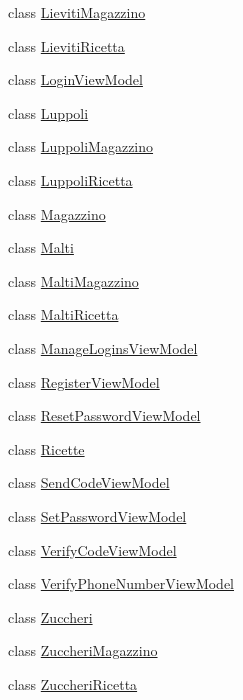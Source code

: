 \begin{DoxyCompactItemize}
\item 
class \mbox{\hyperlink{class_brew_day2_1_1_models_1_1_lieviti_magazzino}{Lieviti\+Magazzino}}
\item 
class \mbox{\hyperlink{class_brew_day2_1_1_models_1_1_lieviti_ricetta}{Lieviti\+Ricetta}}
\item 
class \mbox{\hyperlink{class_brew_day2_1_1_models_1_1_login_view_model}{Login\+View\+Model}}
\item 
class \mbox{\hyperlink{class_brew_day2_1_1_models_1_1_luppoli}{Luppoli}}
\item 
class \mbox{\hyperlink{class_brew_day2_1_1_models_1_1_luppoli_magazzino}{Luppoli\+Magazzino}}
\item 
class \mbox{\hyperlink{class_brew_day2_1_1_models_1_1_luppoli_ricetta}{Luppoli\+Ricetta}}
\item 
class \mbox{\hyperlink{class_brew_day2_1_1_models_1_1_magazzino}{Magazzino}}
\item 
class \mbox{\hyperlink{class_brew_day2_1_1_models_1_1_malti}{Malti}}
\item 
class \mbox{\hyperlink{class_brew_day2_1_1_models_1_1_malti_magazzino}{Malti\+Magazzino}}
\item 
class \mbox{\hyperlink{class_brew_day2_1_1_models_1_1_malti_ricetta}{Malti\+Ricetta}}
\item 
class \mbox{\hyperlink{class_brew_day2_1_1_models_1_1_manage_logins_view_model}{Manage\+Logins\+View\+Model}}
\item 
class \mbox{\hyperlink{class_brew_day2_1_1_models_1_1_register_view_model}{Register\+View\+Model}}
\item 
class \mbox{\hyperlink{class_brew_day2_1_1_models_1_1_reset_password_view_model}{Reset\+Password\+View\+Model}}
\item 
class \mbox{\hyperlink{class_brew_day2_1_1_models_1_1_ricette}{Ricette}}
\item 
class \mbox{\hyperlink{class_brew_day2_1_1_models_1_1_send_code_view_model}{Send\+Code\+View\+Model}}
\item 
class \mbox{\hyperlink{class_brew_day2_1_1_models_1_1_set_password_view_model}{Set\+Password\+View\+Model}}
\item 
class \mbox{\hyperlink{class_brew_day2_1_1_models_1_1_verify_code_view_model}{Verify\+Code\+View\+Model}}
\item 
class \mbox{\hyperlink{class_brew_day2_1_1_models_1_1_verify_phone_number_view_model}{Verify\+Phone\+Number\+View\+Model}}
\item 
class \mbox{\hyperlink{class_brew_day2_1_1_models_1_1_zuccheri}{Zuccheri}}
\item 
class \mbox{\hyperlink{class_brew_day2_1_1_models_1_1_zuccheri_magazzino}{Zuccheri\+Magazzino}}
\item 
class \mbox{\hyperlink{class_brew_day2_1_1_models_1_1_zuccheri_ricetta}{Zuccheri\+Ricetta}}
\end{DoxyCompactItemize}
